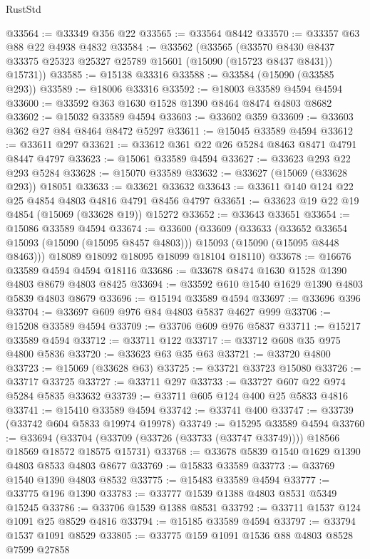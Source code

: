 \begin{lexlean}{RustStd}
\begin{coremodule}
@33564 := @33349 @356 @22
@33565 := @33564 @8442
@33570 := @33357 @63 @88 @22 @4938 @4832
@33584 := @33562
    (@33565
      (@33570 @8430 @8437 @33375 @25323 @25327 @25789 @15601 (@15090 (@15723 @8437 @8431)) @15731))
@33585 := @15138 @33316
@33588 := @33584 (@15090 (@33585 @293))
@33589 := @18006 @33316
@33592 := @18003 @33589 @4594 @4594
@33600 := @33592 @363 @1630 @1528 @1390 @8464 @8474 @4803 @8682
@33602 := @15032 @33589 @4594
@33603 := @33602 @359
@33609 := @33603 @362 @27 @84 @8464 @8472 @5297
@33611 := @15045 @33589 @4594
@33612 := @33611 @297
@33621 := @33612 @361 @22 @26 @5284 @8463 @8471 @4791 @8447 @4797
@33623 := @15061 @33589 @4594
@33627 := @33623 @293 @22 @293 @5284
@33628 := @15070 @33589
@33632 := @33627 (@15069 (@33628 @293)) @18051
@33633 := @33621 @33632
@33643 := @33611 @140 @124 @22 @25 @4854 @4803 @4816 @4791 @8456 @4797
@33651 := @33623 @19 @22 @19 @4854 (@15069 (@33628 @19)) @15272
@33652 := @33643 @33651
@33654 := @15086 @33589 @4594
@33674 := @33600
    (@33609
      (@33633
        (@33652 @33654 @15093 (@15090 (@15095 @8457 @4803)))
        @15093
        (@15090 (@15095 @8448 @8463)))
      @18089
      @18092
      @18095
      @18099
      @18104
      @18110)
@33678 := @16676 @33589 @4594 @4594 @18116
@33686 := @33678 @8474 @1630 @1528 @1390 @4803 @8679 @4803 @8425
@33694 := @33592 @610 @1540 @1629 @1390 @4803 @5839 @4803 @8679
@33696 := @15194 @33589 @4594
@33697 := @33696 @396
@33704 := @33697 @609 @976 @84 @4803 @5837 @4627 @999
@33706 := @15208 @33589 @4594
@33709 := @33706 @609 @976 @5837
@33711 := @15217 @33589 @4594
@33712 := @33711 @122
@33717 := @33712 @608 @35 @975 @4800 @5836
@33720 := @33623 @63 @35 @63
@33721 := @33720 @4800
@33723 := @15069 (@33628 @63)
@33725 := @33721 @33723 @15080
@33726 := @33717 @33725
@33727 := @33711 @297
@33733 := @33727 @607 @22 @974 @5284 @5835 @33632
@33739 := @33711 @605 @124 @400 @25 @5833 @4816
@33741 := @15410 @33589 @4594
@33742 := @33741 @400
@33747 := @33739 (@33742 @604 @5833 @19974 @19978)
@33749 := @15295 @33589 @4594
@33760 := @33694
    (@33704 (@33709 (@33726 (@33733 (@33747 @33749)))) @18566 @18569 @18572 @18575 @15731)
@33768 := @33678 @5839 @1540 @1629 @1390 @4803 @8533 @4803 @8677
@33769 := @15833 @33589
@33773 := @33769 @1540 @1390 @4803 @8532
@33775 := @15483 @33589 @4594
@33777 := @33775 @196 @1390
@33783 := @33777 @1539 @1388 @4803 @8531 @5349 @15245
@33786 := @33706 @1539 @1388 @8531
@33792 := @33711 @1537 @124 @1091 @25 @8529 @4816
@33794 := @15185 @33589 @4594
@33797 := @33794 @1537 @1091 @8529
@33805 := @33775 @159 @1091 @1536 @88 @4803 @8528 @7599 @27858

\end{coremodule}
\end{lexlean}

